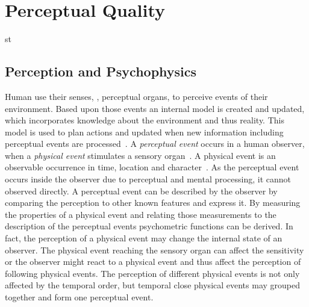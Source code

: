 \chapter{Perceptual Quality}\label{chap:02}
st
\section{Perception and Psychophysics}
Human use their senses, \ie, perceptual organs, to perceive events of their environment.
Based upon those events an internal model is created and updated, which incorporates knowledge about the environment and thus reality.
This model is used to plan actions and updated when new information including perceptual events are processed~\citep[p. 4]{blauert_spatial_1996}.
A \emph{perceptual event} occurs in a human observer, when a \emph{physical event} stimulates a sensory organ~\citep{blauert_spatial_1996}.
A physical event is an observable occurrence in time, location and character~\citep{callet_qualinet_2013}.
As the perceptual event occurs inside the observer due to perceptual and mental processing, it cannot observed directly.
A perceptual event can be described by the observer by comparing the perception to other known features and express it.
By measuring the properties of a physical event and relating those measurements to the description of the perceptual events psychometric functions can be derived.
In fact, the perception of a physical event may change the internal state of an observer.
The physical event reaching the sensory organ can affect the sensitivity or the observer might react to a physical event and thus affect the perception of following physical events.
The perception of different physical events is not only affected by the temporal order, but temporal close physical events may grouped together and form one perceptual event.

